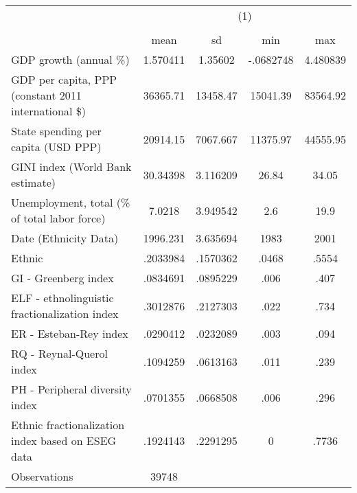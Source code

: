 {
\def\sym#1{\ifmmode^{#1}\else\(^{#1}\)\fi}
\begin{tabular}{l*{1}{cccc}}
\hline\hline
                    &\multicolumn{4}{c}{(1)}                            \\
                    &\multicolumn{4}{c}{}                               \\
                    &        mean&          sd&         min&         max\\
\hline
GDP growth (annual \%)&    1.570411&     1.35602&   -.0682748&    4.480839\\
GDP per capita, PPP (constant 2011 international \$)&    36365.71&    13458.47&    15041.39&    83564.92\\
State spending per capita (USD PPP)&    20914.15&    7067.667&    11375.97&    44555.95\\
GINI index (World Bank estimate)&    30.34398&    3.116209&       26.84&       34.05\\
Unemployment, total (\% of total labor force)&      7.0218&    3.949542&         2.6&        19.9\\
Date (Ethnicity Data)&    1996.231&    3.635694&        1983&        2001\\
Ethnic              &    .2033984&    .1570362&       .0468&       .5554\\
GI - Greenberg index&    .0834691&    .0895229&        .006&        .407\\
ELF - ethnolinguistic fractionalization index &    .3012876&    .2127303&        .022&        .734\\
ER - Esteban-Rey index&    .0290412&    .0232089&        .003&        .094\\
RQ - Reynal-Querol index&    .1094259&    .0613163&        .011&        .239\\
PH - Peripheral diversity index&    .0701355&    .0668508&        .006&        .296\\
Ethnic fractionalization index based on ESEG data &    .1924143&    .2291295&           0&       .7736\\
\hline
Observations        &       39748&            &            &            \\
\hline\hline
\end{tabular}
}
